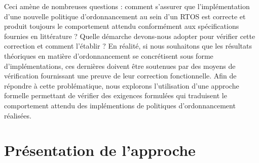 Ceci amène de nombreuses questions : comment s'assurer que l'implémentation d'une nouvelle politique d'ordonnancement au sein d'un RTOS est correcte et produit toujours le comportement attendu conformément aux spécifications fournies en littérature ? Quelle démarche devons-nous adopter pour vérifier cette correction et comment l'établir ?  En réalité, si nous souhaitons que les résultats théoriques en matière d'ordonnancement se concrétisent sous forme d'implémentations, ces dernières doivent être soutenues par des moyens de vérification fournissant une preuve de leur correction fonctionnelle. Afin de répondre à cette problématique, nous explorons l'utilisation d'une approche formelle permettant de vérifier des exigences formulées qui traduisent le comportement attendu des implémentions de politiques d'ordonnancement réalisées.



\section{Présentation de l'approche}
 
